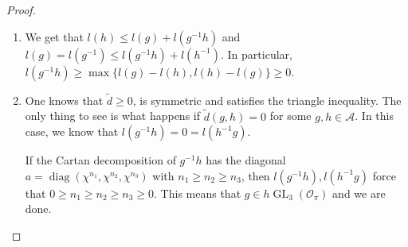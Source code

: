 \documentclass{eptcs}
\theoremstyle{remark}
\theoremstyle{definition}
\DeclareMathOperator{\GL}{GL}
\DeclareMathOperator{\diag}{diag}
\begin{document}
\begin{proof}
\begin{enumerate}
    \item 
	We get that $l(h) \leq l(g) + l(g^{-1}h)$ and $l(g) = l (g^{-1}) \leq l(g^{-1}h) + l(h^{-1}) $. In particular, $l(g^{-1} h) \geq \max\{ l(g)-l(h), l(h)-l(g)\} \geq 0 $.
\item One knows that $\tilde{d} \geq 0$, is symmetric and satisfies the triangle inequality. The only thing to see is what happens if $\tilde{d}(g,h) =0$ for some $g,h \in \mathcal{A}$. In this case, we know that $l(g^{-1} h) = 0 = l(h^{-1}g)$.
    
    If the Cartan decomposition of $g^{-1} h$ has the diagonal $a = \diag(\chi^{n_{1}},\chi^{n_{2}},\chi^{n_{3}})$ with $n_{1} \geq n_{2} \geq n_{3}$, then $l(g^{-1}h), l(h^{-1}g)$ force that $0 \geq n_{1} \geq n_{2} \geq n_{3} \geq 0$.
    This means that $g \in h \GL_{3}(\mathcal{O}_{\pi})$ and we are done.



    \end{enumerate}
\end{proof}
\end{document}
